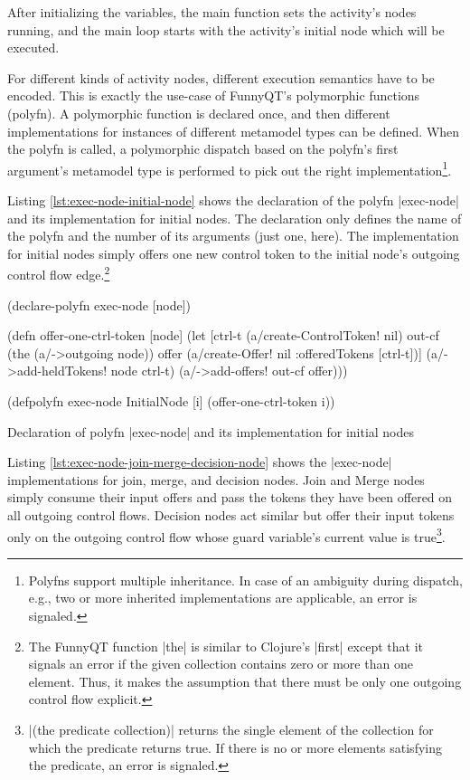 \documentclass[submission]{eptcs}
\newcommand{\code}{\clojureinline}
\begin{document}
After initializing the variables, the main function sets the activity's nodes
running, and the main loop starts with the activity's initial node which will
be executed.

For different kinds of activity nodes, different execution semantics have to be
encoded.  This is exactly the use-case of FunnyQT's polymorphic functions
(polyfn).  A polymorphic function is declared once, and then different
implementations for instances of different metamodel types can be defined.
When the polyfn is called, a polymorphic dispatch based on the polyfn's first
argument's metamodel type is performed to pick out the right
implementation\footnote{Polyfns support multiple inheritance.  In case of an
  ambiguity during dispatch, e.g., two or more inherited implementations are
  applicable, an error is signaled.}.

Listing \vref{lst:exec-node-initial-node} shows the declaration of the polyfn
\code|exec-node| and its implementation for initial nodes.  The declaration
only defines the name of the polyfn and the number of its arguments (just one,
here).  The implementation for initial nodes simply offers one new control
token to the initial node's outgoing control flow edge.\footnote{The FunnyQT
  function \code|the| is similar to Clojure's \code|first| except that it
  signals an error if the given collection contains zero or more than one
  element.  Thus, it makes the assumption that there must be only one outgoing
  control flow explicit.}

\begin{listing}[h!tb]
\begin{clojurecode}
(declare-polyfn exec-node [node])

(defn offer-one-ctrl-token [node]
  (let [ctrl-t (a/create-ControlToken! nil)
        out-cf (the (a/->outgoing node))
        offer  (a/create-Offer! nil {:offeredTokens [ctrl-t]})]
    (a/->add-heldTokens! node ctrl-t)
    (a/->add-offers! out-cf offer)))

(defpolyfn exec-node InitialNode [i]
  (offer-one-ctrl-token i))
\end{clojurecode}
\caption{Declaration of polyfn \code|exec-node| and its implementation for initial nodes}
\label{lst:exec-node-initial-node}
\end{listing}

Listing \vref{lst:exec-node-join-merge-decision-node} shows the
\code|exec-node| implementations for join, merge, and decision nodes.  Join and
Merge nodes simply consume their input offers and pass the tokens they have
been offered on all outgoing control flows.  Decision nodes act similar but
offer their input tokens only on the outgoing control flow whose guard
variable's current value is true\footnote{\code|(the predicate collection)|
  returns the single element of the collection for which the predicate returns
  true.  If there is no or more elements satisfying the predicate, an error is
  signaled.}.
\end{document}
